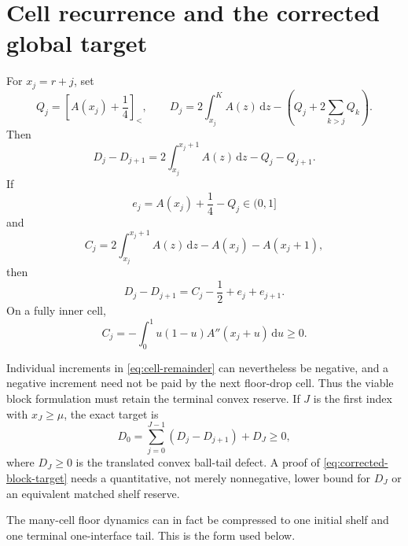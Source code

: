 \documentclass[11pt]{article}
\theoremstyle{remark}
\newcommand{\sbr}[1]{[#1]_{<}}
\newcommand{\dd}{\,\mathrm d}
\begin{document}
\section{Cell recurrence and the corrected global target}

For $x_j=r+j$, set
\[
 Q_j=\sbr{A(x_j)+\frac14},
 \qquad
 D_j=2\int_{x_j}^KA(z)\dd z-
 \left(Q_j+2\sum_{k>j}Q_k\right).
\]
Then
\begin{equation}
 D_j-D_{j+1}
 =2\int_{x_j}^{x_j+1}A(z)\dd z-Q_j-Q_{j+1}.
 \label{eq:cell-recurrence}
\end{equation}
If
\[
 e_j=A(x_j)+\frac14-Q_j\in(0,1]
\]
and
\[
 C_j=2\int_{x_j}^{x_j+1}A(z)\dd z-A(x_j)-A(x_j+1),
\]
then
\begin{equation}
 D_j-D_{j+1}=C_j-\frac12+e_j+e_{j+1}.
 \label{eq:cell-remainder}
\end{equation}
On a fully inner cell,
\[
 C_j=-\int_0^1u(1-u)A''(x_j+u)\dd u\geq0.
\]

Individual increments in \eqref{eq:cell-remainder} can nevertheless be
negative, and a negative increment need not be paid by the next floor-drop
cell.  Thus the viable block formulation must retain the terminal convex
reserve.  If $J$ is the first index with $x_J\geq\mu$, the exact target is
\begin{equation}
 \boxed{
 D_0=\sum_{j=0}^{J-1}(D_j-D_{j+1})+D_J\geq0,}
 \label{eq:corrected-block-target}
\end{equation}
where $D_J\geq0$ is the translated convex ball-tail defect.  A proof of
\eqref{eq:corrected-block-target} needs a quantitative, not merely
nonnegative, lower bound for $D_J$ or an equivalent matched shelf reserve.

The many-cell floor dynamics can in fact be compressed to one initial
shelf and one terminal one-interface tail.  This is the form used below.
\end{document}

